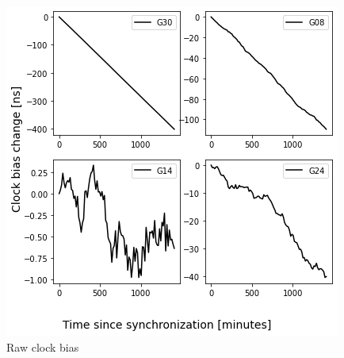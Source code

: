 \documentclass{kybernetika}
\begin{document}
\begin{figure}[ht] 
\centering
\includegraphics[width=\textwidth]{figures/bias_raw}
\caption{Raw clock bias}
\label{fig:bias_raw}
\end{figure}

\end{document}
